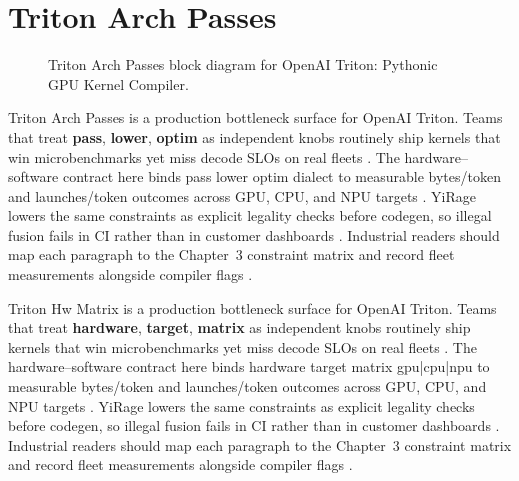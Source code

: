 \section{Triton Arch Passes}
\label{sec:triton_arch_passes}
\begin{figure}[t]
\centering
{}
\caption{Triton Arch Passes block diagram for OpenAI Triton: Pythonic GPU Kernel Compiler.}
\label{fig:triton_arch_passes_architecture}
\end{figure}


Triton Arch Passes is a production bottleneck surface for OpenAI Triton. Teams that treat \textbf{pass}, \textbf{lower}, \textbf{optim} as independent knobs routinely ship kernels that win microbenchmarks yet miss decode SLOs on real fleets \citep{taxbreak2026,semianalysis2024tma}. The hardware--software contract here binds pass lower optim dialect to measurable bytes/token and launches/token outcomes across GPU, CPU, and NPU targets \citep{memoryfloor2026,amd2024xdna}. YiRage lowers the same constraints as explicit legality checks before codegen, so illegal fusion fails in CI rather than in customer dashboards \citep{nvidia2022hopper,amd2024aie}. Industrial readers should map each paragraph to the Chapter~3 constraint matrix and record fleet measurements alongside compiler flags \citep{semianalysis2024tma,dlbook}.

Triton Hw Matrix is a production bottleneck surface for OpenAI Triton. Teams that treat \textbf{hardware}, \textbf{target}, \textbf{matrix} as independent knobs routinely ship kernels that win microbenchmarks yet miss decode SLOs on real fleets \citep{liu2024deepseekv3,memoryfloor2026}. The hardware--software contract here binds hardware target matrix gpu|cpu|npu to measurable bytes/token and launches/token outcomes across GPU, CPU, and NPU targets \citep{patel2025llminference,nvidia2022hopper}. YiRage lowers the same constraints as explicit legality checks before codegen, so illegal fusion fails in CI rather than in customer dashboards \citep{taxbreak2026,semianalysis2024tma}. Industrial readers should map each paragraph to the Chapter~3 constraint matrix and record fleet measurements alongside compiler flags \citep{memoryfloor2026,amd2024xdna}.

